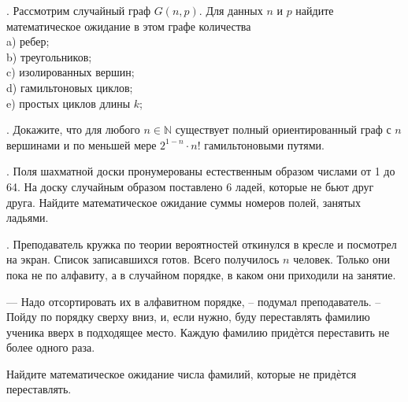 . Рассмотрим случайный граф $G(n,p)$. Для данных $n$ и $p$ найдите математическое
ожидание в этом графе количества\\
a) ребер;\\
b) треугольников;\\
c) изолированных вершин;\\
d) гамильтоновых циклов;\\
e) простых циклов длины $k$;

. Докажите, что для любого $n\in\mathbb{N}$ существует полный ориентированный 
граф с $n$ вершинами и по меньшей мере $2^{1-n}\cdot n!$ гамильтоновыми путями.

\newpage


. Поля шахматной доски пронумерованы естественным образом числами от 1 до 64. 
На доску случайным образом поставлено 6 ладей, которые не бьют друг друга.
Найдите математическое ожидание суммы номеров полей, занятых ладьями.

. Преподаватель кружка по теории вероятностей откинулся в кресле и посмотрел на экран. 
Список записавшихся готов. Всего получилось $n$ человек. Только они пока не по алфавиту, 
а в случайном порядке, в каком они приходили на занятие. 

--- Надо отсортировать их в алфавитном порядке, -- подумал преподаватель. -- Пойду по порядку сверху вниз,
и, если нужно, буду переставлять фамилию ученика вверх в подходящее место. 
Каждую фамилию придѐтся переставить не более одного раза.

Найдите математическое ожидание числа фамилий, которые не придѐтся переставлять.




